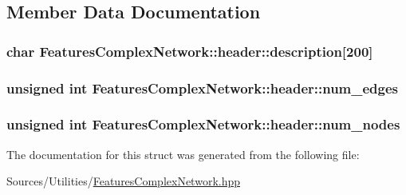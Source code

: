 \subsection{Member Data Documentation}
\hypertarget{struct_features_complex_network_1_1header_a945df90d139764d666deaa9d97a773ff}{
\subsubsection[{description}]{\setlength{\rightskip}{0pt plus 5cm}char Features\+Complex\+Network\+::header\+::description\mbox{[}200\mbox{]}}}\label{struct_features_complex_network_1_1header_a945df90d139764d666deaa9d97a773ff}
\hypertarget{struct_features_complex_network_1_1header_a7cc9d5e2f1368904ae6b75027f3714d6}{
\subsubsection[{num\+\_\+edges}]{\setlength{\rightskip}{0pt plus 5cm}unsigned int Features\+Complex\+Network\+::header\+::num\+\_\+edges}}\label{struct_features_complex_network_1_1header_a7cc9d5e2f1368904ae6b75027f3714d6}
\hypertarget{struct_features_complex_network_1_1header_ada02d47d8920c0e0d6429580ca9c370e}{
\subsubsection[{num\+\_\+nodes}]{\setlength{\rightskip}{0pt plus 5cm}unsigned int Features\+Complex\+Network\+::header\+::num\+\_\+nodes}}\label{struct_features_complex_network_1_1header_ada02d47d8920c0e0d6429580ca9c370e}


The documentation for this struct was generated from the following file\+:\begin{DoxyCompactItemize}
\item 
Sources/\+Utilities/\hyperlink{_features_complex_network_8hpp}{Features\+Complex\+Network.\+hpp}\end{DoxyCompactItemize}
